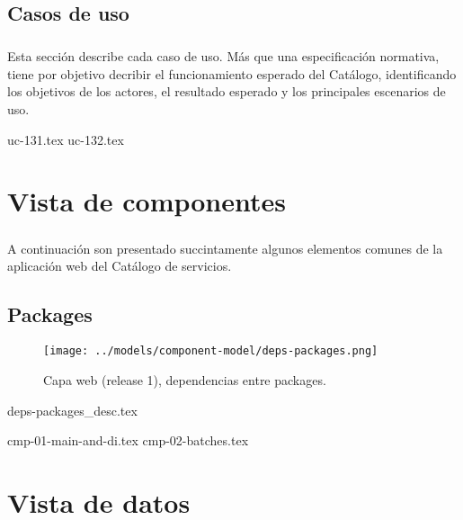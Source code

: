 \documentclass[11pt,letterpaper]{report}
\begin{document}
\section{Casos de uso}
\paragraph{}
Esta secci\'on describe cada caso de uso. 
M\'as que una especificaci\'on normativa,
tiene por objetivo decribir el funcionamiento esperado del Cat\'alogo,
identificando los objetivos de los actores, el resultado esperado y
los principales escenarios de uso.

{uc-131.tex}
{uc-132.tex}


\chapter{Vista de componentes}
\paragraph{}
A continuaci\'on son presentado succintamente algunos elementos comunes de
la aplicaci\'on web del Cat\'alogo de servicios.


\section{Packages}

\begin{figure}[htb]
    \centering
    \texttt{[image: ../models/component-model/deps-packages.png]}
    \caption{Capa web (release 1), dependencias entre packages.}
    \label{fig:pkg-deps}
\end{figure}

{deps-packages_desc.tex}


{cmp-01-main-and-di.tex}
{cmp-02-batches.tex}


\chapter{Vista de datos}
\end{document}
